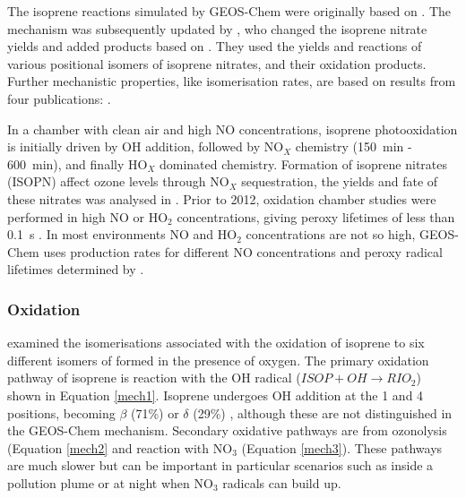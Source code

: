     The isoprene reactions simulated by GEOS-Chem were originally based on \textcite{Horowitz1998}.
    The mechanism was subsequently updated by \textcite{Mao2013}, who changed the isoprene nitrate yields and added products based on \textcite{Paulot2009a, Paulot2009b}.
    They used the yields and reactions of various positional isomers of isoprene nitrates, and their oxidation products. %
    Further mechanistic properties, like isomerisation rates, are based on results from four publications: \textcite{Peeters2009, Peeters2010, Crounse2011, Crounse2012}.    
    
    In a chamber with clean air and high NO concentrations, isoprene photooxidation is initially driven by OH addition, followed by NO$_X$ chemistry (150~min - 600~min), and finally HO$_X$ dominated chemistry.
    Formation of isoprene nitrates (ISOPN) affect ozone levels through NO$_X$ sequestration, the yields and fate of these nitrates was analysed in \textcite{Paulot2009a}.
    Prior to 2012, oxidation chamber studies were performed in high NO or HO$_2$ concentrations, giving peroxy lifetimes of less than 0.1~s \parencite{Crounse2012, Wolfe2012}.
    In most environments NO and HO$_2$ concentrations are not so high, GEOS-Chem uses production rates for different NO concentrations and peroxy radical lifetimes determined by \textcite{Crounse2012}.
    
    \subsubsection{Oxidation}
    
      \textcite{Crounse2011} examined the isomerisations associated with the oxidation of isoprene to six different isomers of \roo formed in the presence of oxygen.
      The primary oxidation pathway of isoprene is reaction with the OH radical ($ ISOP + OH \to RIO_2 $) shown in Equation \ref{mech1}.
      Isoprene undergoes OH addition at the 1 and 4 positions, becoming $\beta$ (71\%) or $\delta$ (29\%) \roo, although these are not distinguished in the GEOS-Chem mechanism. 
      Secondary oxidative pathways are from ozonolysis (Equation \ref{mech2} and reaction with NO$_3$ (Equation \ref{mech3}).
      These pathways are much slower but can be important in particular scenarios such as inside a pollution plume or at night when NO$_3$ radicals can build up.
    
